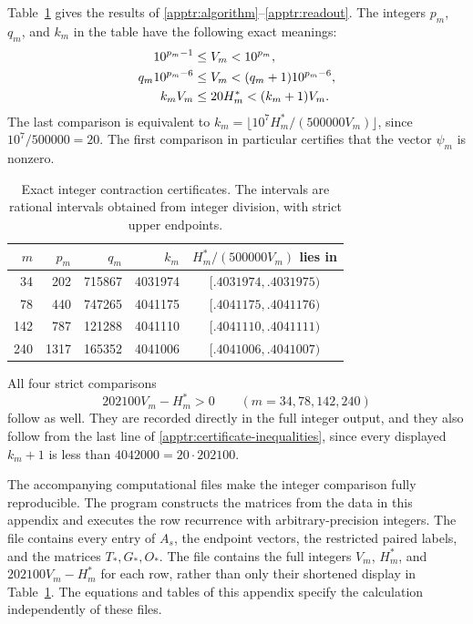 Table~\ref{apptr:certificate-table} gives the results of
\eqref{apptr:algorithm}--\eqref{apptr:readout}.  The integers $p_m$,
$q_m$, and $k_m$ in the table have the following exact meanings:
\begin{align}
 10^{p_m-1}&\le V_m<10^{p_m},\notag\\
 q_m10^{p_m-6}&\le V_m<(q_m+1)10^{p_m-6},\notag\\
 k_mV_m&\le20H_m^*<(k_m+1)V_m.
 \label{apptr:certificate-inequalities}
\end{align}
The last comparison is equivalent to
$k_m=\lfloor10^7H_m^*/(500000V_m)\rfloor$, since
$10^7/500000=20$.  The first comparison in particular certifies
that the vector $\psi_m$ is nonzero.

\begin{table}[htbp]
\centering
\begin{tabular}{r|r|r|r|c}
 $m$&$p_m$&$q_m$&$k_m$&
 $H_m^*/(500000V_m)$ lies in\\ \hline
 34&202&715867&4031974&$[.4031974,.4031975)$\\
 78&440&747265&4041175&$[.4041175,.4041176)$\\
 142&787&121288&4041110&$[.4041110,.4041111)$\\
 240&1317&165352&4041006&$[.4041006,.4041007)$
\end{tabular}
\caption{Exact integer contraction certificates.  The intervals
are rational intervals obtained from integer division, with strict
upper endpoints.}
\label{apptr:certificate-table}
\end{table}

All four strict comparisons
\begin{equation}\label{apptr:strict-margin}
 202100V_m-H_m^*>0
 \qquad(m=34,78,142,240)
\end{equation}
follow as well.  They are recorded directly in the full integer
output, and they also follow from the last line of
\eqref{apptr:certificate-inequalities}, since every displayed
$k_m+1$ is less than $4042000=20\cdot202100$.

The accompanying computational files make the integer comparison
fully reproducible.  The program
 constructs the matrices from
the data in this appendix and executes the row recurrence with
arbitrary-precision integers.  The file
 contains every
entry of $A_s$, the endpoint vectors, the restricted paired labels,
and the matrices $T_*,G_*,O_*$.  The file
 contains the full
integers $V_m$, $H_m^*$, and $202100V_m-H_m^*$ for each row,
rather than only their shortened display in
Table~\ref{apptr:certificate-table}.  The equations and tables of
this appendix specify the calculation independently of these files.

